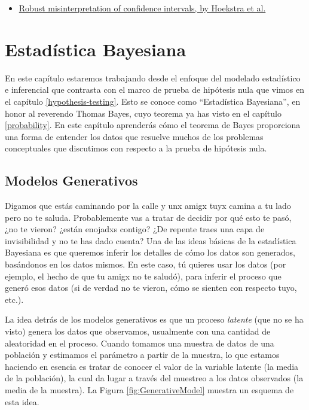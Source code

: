 \documentclass[
  12pt,
]{book}
\providecommand{\tightlist}{%
  \setlength{\itemsep}{0pt}\setlength{\parskip}{0pt}}
\begin{document}
\begin{itemize}
\tightlist
\item
  \href{http://www.ejwagenmakers.com/inpress/HoekstraEtAlPBR.pdf}{Robust misinterpretation of confidence intervals, by Hoekstra et al.}
\end{itemize}

\hypertarget{estaduxedstica-bayesiana}{%
\chapter{Estadística Bayesiana}\label{estaduxedstica-bayesiana}}

En este capítulo estaremos trabajando desde el enfoque del modelado estadístico e inferencial que contrasta con el marco de prueba de hipótesis nula que vimos en el capítulo \ref{hypothesis-testing}.
Esto se conoce como ``Estadística Bayesiana'', en honor al reverendo Thomas Bayes, cuyo teorema ya has visto en el capítulo \ref{probability}. En este capítulo aprenderás cómo el teorema de Bayes proporciona una forma de entender los datos que resuelve muchos de los problemas conceptuales que discutimos con respecto a la prueba de hipótesis nula.

\hypertarget{modelos-generativos}{%
\section{Modelos Generativos}\label{modelos-generativos}}

Digamos que estás caminando por la calle y unx amigx tuyx camina a tu lado pero no te saluda. Probablemente vas a tratar de decidir por qué esto te pasó, ¿no te vieron? ¿están enojadxs contigo? ¿De repente traes una capa de invisibilidad y no te has dado cuenta? Una de las ideas básicas de la estadística Bayesiana es que queremos inferir los detalles de cómo los datos son generados, basándonos en los datos mismos. En este caso, tú quieres usar los datos (por ejemplo, el hecho de que tu amigx no te saludó), para inferir el proceso que generó esos datos (si de verdad no te vieron, cómo se sienten con respecto tuyo, etc.).

La idea detrás de los modelos generativos es que un proceso \emph{latente} (que no se ha visto) genera los datos que observamos, usualmente con una cantidad de aleatoridad en el proceso. Cuando tomamos una muestra de datos de una población y estimamos el parámetro a partir de la muestra, lo que estamos haciendo en esencia es tratar de conocer el valor de la variable latente (la media de la población), la cual da lugar a través del muestreo a los datos observados (la media de la muestra). La Figura \ref{fig:GenerativeModel} muestra un esquema de esta idea.
\end{document}
